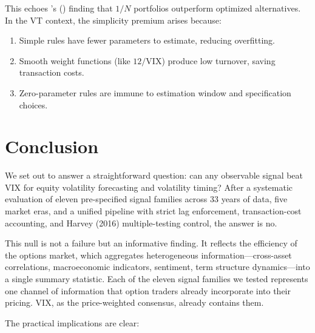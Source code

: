 \documentclass[12pt,a4paper]{article}
\begin{document}
This echoes \citeauthor{demiguel2009}'s (\citeyear{demiguel2009}) finding that $1/N$ portfolios outperform optimized alternatives. In the VT context, the simplicity premium arises because:
\begin{enumerate}
    \item Simple rules have fewer parameters to estimate, reducing overfitting.
    \item Smooth weight functions (like $12/\text{VIX}$) produce low turnover, saving transaction costs.
    \item Zero-parameter rules are immune to estimation window and specification choices.
\end{enumerate}


\section{Conclusion}
\label{sec:conclusion}

We set out to answer a straightforward question: can any observable signal beat VIX for equity volatility forecasting and volatility timing? After a systematic evaluation of eleven pre-specified signal families across 33 years of data, five market eras, and a unified pipeline with strict lag enforcement, transaction-cost accounting, and Harvey (2016) multiple-testing control, the answer is no.

This null is not a failure but an informative finding. It reflects the efficiency of the options market, which aggregates heterogeneous information---cross-asset correlations, macroeconomic indicators, sentiment, term structure dynamics---into a single summary statistic. Each of the eleven signal families we tested represents one channel of information that option traders already incorporate into their pricing. VIX, as the price-weighted consensus, already contains them.

The practical implications are clear:
\end{document}
